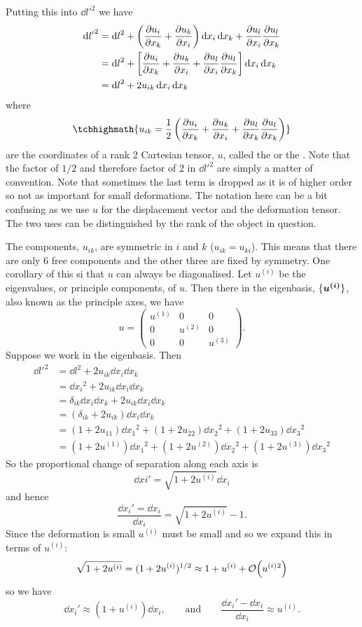 \documentclass[a4paper]{article}
\begin{document}
    Putting this into \(\dd{l'}^2\) we have
    \begin{align*}
        \dd{l'}^2 &= \dd{l}^2 + \left(\pdv{u_i}{x_k} + \pdv{u_k}{x_i}\right) \dd{x_i}\dd{x_k} + \pdv{u_l}{x_i}\pdv{u_l}{x_k}\\
        &= \dd{l}^2 + \left[\pdv{u_i}{x_k} + \pdv{u_k}{x_i} + \pdv{u_l}{x_i}\pdv{u_l}{x_k}\right]\dd{x_i}\dd{x_k}\\
        &= \dd{l}^2 + 2u_{ik}\dd{x_i}\dd{x_k}
    \end{align*}
    where
    \[\tcbhighmath{
        u_{ik} = \frac{1}{2}\left(\pdv{u_i}{x_k} + \pdv{u_k}{x_i} + \pdv{u_l}{x_k}\pdv{u_l}{x_k}\right)
    }\]
    are the coordinates of a rank 2 Cartesian tensor, \(u\), called the  or the .
    Note that the factor of \(1/2\) and therefore factor of 2 in \(\dd{l'}^2\) are simply a matter of convention.
    Note that sometimes the last term is dropped as it is of higher order so not as important for small deformations.
    The notation here can be a bit confusing as we use \(u\) for the displacement vector and the deformation tensor.
    The two uses can be distinguished by the rank of the object in question.
    
    The components, \(u_{ik}\), are symmetric in \(i\) and \(k\) (\(u_{ik} = u_{ki}\)).
    This means that there are only 6 free components and the other three are fixed by symmetry.
    One corollary of this si that \(u\) can always be diagonalised.
    Let \(u^{(i)}\) be the eigenvalues, or principle components, of \(u\).
    Then there in the eigenbasis, \(\{\bm{u^{(i)}}\}\), also known as the principle axes, we have
    \[
        u = 
        \begin{pmatrix}
            u^{(1)} & 0 & 0\\
            0 & u^{(2)} & 0\\
            0 & 0 & u^{(3)}
        \end{pmatrix}
        .
    \]
    Suppose we work in the eigenbasis.
    Then
    \begin{align*}
        \dd{l'}^2 &= \dd{l}^2 + 2u_{ik}\dd{x_i}\dd{x_k}\\
        &= \dd{x_i}^2 + 2u_{ik}\dd{x_i}\dd{x_k}\\
        &= \delta_{ik}\dd{x_i}\dd{x_k} + 2u_{ik}\dd{x_i}\dd{x_k}\\
        &= (\delta_{ik} + 2u_{ik})\dd{x_i}\dd{x_k}\\
        &= (1 + 2u_{11})\dd{x_1}^2 + (1 + 2u_{22})\dd{x_2}^2 + (1 + 2u_{33})\dd{x_3}^2\\
        &= (1 + 2u^{(1)})\dd{x_1}^2 + (1 + 2u^{(2)})\dd{x_2}^2 + (1 + 2u^{(3)})\dd{x_3}^2
    \end{align*}
    So the proportional change of separation along each axis is
    \[\dd{xi'} = \sqrt{1 + 2u^{(i)}}\dd{x_i}\]
    and hence
    \[\frac{\dd{x_i'} = \dd{x_i}}{\dd{x_i}} = \sqrt{1 + 2u^{(i)}} - 1.\]
    Since the deformation is small \(u^{(i)}\) must be small and so we expand this in terms of \(u^{(i)}\):
    \[\sqrt{1 + 2u^{(i)}} = (1 + 2u^{(i)})^{1/2} \approx 1 + u^{(i)} + \order{u^{(i)}{^2}}\]
    so we have
    \[\dd{x_i'} \approx (1 + u^{(i)})\dd{x_i}, \qquad\text{and}\qquad \frac{\dd{x_i'} - \dd{x_i}}{\dd{x_i}} \approx u^{(i)}.\]
    
\end{document}
